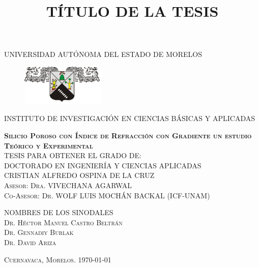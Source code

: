 \documentclass[a4paper,11pt,]{book}
\begin{document}
\begin{titlepage}

\begin{center}

\textsc{UNIVERSIDAD AUTÓNOMA DEL ESTADO DE MORELOS}
\begin{figure}[H]
\begin{center}
\includegraphics[width=40mm]{../Images/uaem}
\end{center}
\end{figure}
\textsc{  \scriptsize INSTITUTO  DE INVESTIGACIÓN EN CIENCIAS BÁSICAS Y APLICADAS}\\[4em]

\title{TÍTULO DE LA TESIS} %

\textbf{\textsc{Silicio Poroso con Índice de Refracción con Gradiente un estudio Teórico y Experimental  }}\\[4em]


\textsc{\scriptsize TESIS PARA OBTENER EL GRADO DE:\\  DOCTORADO EN INGENIERÍA Y CIENCIAS APLICADAS}\\[1em]


\textsc{\Large CRISTIAN ALFREDO OSPINA DE LA CRUZ}\\[3em]
\textsc{\scriptsize Asesor:  Dra. VIVECHANA AGARWAL }\\[0.5em]
\textsc{\scriptsize Co-Asesor: Dr. WOLF LUIS MOCHÁN BACKAL  (ICF-UNAM)} \\[3em]

\end{center}

\begin{flushleft}
\textsc{NOMBRES DE LOS SINODALES\\
	Dr. Héctor Manuel Castro Beltrán\\
	Dr. Gennadiy Burlak\\
	Dr. David Ariza}	
\end{flushleft}

\vspace*{\fill}
\textsc{Cuernavaca, Morelos. \hspace*{\fill} \today }

\end{titlepage}
\end{document}
